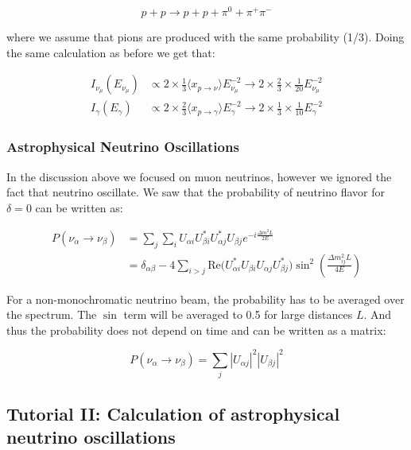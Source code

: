 \documentclass[
  letterpaper,
  DIV=11,
  numbers=noendperiod]{scrreprt}
\begin{document}
\[p + p \rightarrow p + p + \pi^0 + \pi^+ \pi^-\]

where we assume that pions are produced with the same probability (1/3).
Doing the same calculation as before we get that:

\[\begin{aligned}
    I_{\nu_\mu}(E_{\nu_\mu}) &\propto 2 \times \frac{1}{3} \langle x_{p\rightarrow\nu}\rangle E_{\nu_\mu}^{-2} \rightarrow 2 \times \frac{2}{3} \times \frac{1}{20} E_{\nu_\mu}^{-2}\\
    I_\gamma(E_\gamma) &\propto 2 \times \frac{2}{3}\langle x_{p\rightarrow\gamma}\rangle  E_\gamma^{-2} \rightarrow  2 \times \frac{1}{3} \times \frac{1}{10} E_{\gamma}^{-2}
\end{aligned}\]

\subsubsection{Astrophysical Neutrino
Oscillations}\label{astrophysical-neutrino-oscillations}

In the discussion above we focused on muon neutrinos, however we ignored
the fact that neutrino oscillate. We saw that the probability of
neutrino flavor for \(\delta = 0\) can be written as:

\[\begin{aligned}
P(\nu_\alpha \rightarrow \nu_\beta) &=\sum_j\sum_i U_{\alpha i}U^*_{\beta i}U^*_{\alpha  j}U_{\beta j}e^{-i\frac{\Delta m^2L}{2E}}\\
&= \delta_{\alpha\beta}  -  4{\sum_{i>j}\mathrm{ Re}(U_{\alpha i}^{*}U_{\beta i}U_{\alpha j}U_{\beta j}^{*}})\sin^{2}(\frac{\Delta m_{ij}^{2}L}{4E})
\end{aligned}\]

For a non-monochromatic neutrino beam, the probability has to be
averaged over the spectrum. The \(\sin\) term will be averaged to 0.5
for large distances \(L\). And thus the probability does not depend on
time and can be written as a matrix:

\[P(\nu_\alpha \rightarrow \nu_\beta) = \sum_j |U_{\alpha  j}|^2 |U_{\beta j}|^2 \]

\subsection{Tutorial II: Calculation of astrophysical neutrino
oscillations}\label{tutorial-ii-calculation-of-astrophysical-neutrino-oscillations}
\end{document}
